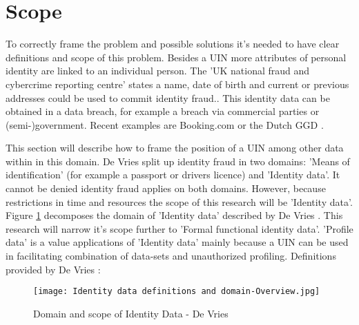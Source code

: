 \section{Scope} \label{scope}
To correctly frame the problem and possible solutions it's needed to have clear definitions and scope of this problem. Besides a UIN more attributes of personal identity are linked to an individual person. The 'UK national fraud and cybercrime reporting centre' states a name, date of birth and current or previous addresses could be used to commit identity fraud.\cite{Action_fraud}. This identity data can be obtained in a data breach, for example a breach via commercial parties or (semi-)government. Recent examples are Booking.com \cite{Booking_databreach} or the Dutch GGD \cite{GGD_databreach}.

This section will describe how to frame the position of a UIN among other data within in this domain.
De Vries \etal \cite{Vries2007IdentiteitsfraudeEA} split up identity fraud in two domains: 'Means of identification' (for example a passport or drivers licence) and 'Identity data'. It cannot be denied identity fraud applies on both domains. However, because restrictions in time and resources the scope of this research will be 'Identity data'.
Figure \ref{fig:ID_domain} decomposes the domain of 'Identity data' described by De Vries \etal. This research will narrow it's scope further to 'Formal functional identity data'. 'Profile data' is a value applications of 'Identity data' mainly because a UIN can be used in facilitating combination of data-sets and unauthorized profiling. Definitions provided by De Vries \etal: 


    \begin{figure}
        \graphicspath{ {./images/} }
        \texttt{[image: Identity data definitions and domain-Overview.jpg]}\\
        \caption{Domain and scope of Identity Data - De Vries \etal \cite{Vries2007IdentiteitsfraudeEA}}
        \label{fig:ID_domain}
    \end{figure}

